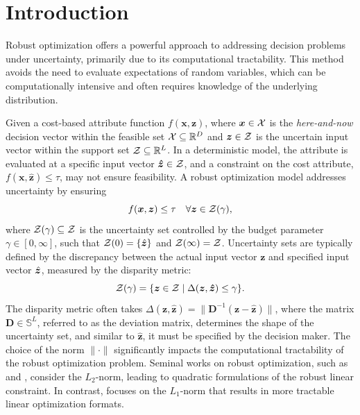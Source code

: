 \documentclass[opre, nonblindrev]{informswp}
\newcommand{\1}[1]{\mathds{1}{\left(#1\right)}}
\begin{document}

\maketitle

\section{Introduction}

Robust optimization offers a powerful approach to addressing decision problems under uncertainty, primarily due to its computational tractability. This method avoids the need to evaluate expectations of random variables, which can be computationally intensive and often requires knowledge of the underlying distribution.

Given a cost-based attribute function \( f(\bm x, \bm z) \), where \( \bm x \in \mathcal{X} \) is the \emph{here-and-now} decision vector within the feasible set \( \mathcal{X} \subseteq \mathbb{R}^D \) and \( \bm z \in \mathcal{Z} \) is the uncertain input vector within the support set \( \mathcal{Z} \subseteq \mathbb{R}^L \). In a deterministic model, the attribute is evaluated at a specific input vector \( \bm{\hat{z}} \in \mathcal{Z} \), and a constraint on the cost attribute, \( f(\bm x, \bm{\hat{z}}) \leq \tau \), may not ensure feasibility. A robust optimization model addresses uncertainty by ensuring
\[ 
f(\bm x, \bm z) \leq \tau \quad \forall \bm z \in \mathcal{Z}(\gamma), 
\]
where \( \mathcal{Z}(\gamma) \subseteq \mathcal{Z} \) is the uncertainty set controlled by the budget parameter \( \gamma \in [0, \infty] \), such that \( \mathcal{Z}(0) = \{\hat{\bm{z}}\} \) and \( \mathcal{Z}(\infty) = \mathcal{Z} \). Uncertainty sets are typically defined by the discrepancy between the actual input vector $\bm z$ and specified input vector $\hat{\bm{z}}$, measured by the disparity metric:
$$
\mathcal{Z}(\gamma) = \{ \bm z \in \mathcal{Z} \;|\; \Delta(\bm z, \bm{\hat{z}}) \leq \gamma \}.
$$
The disparity metric often takes $\Delta(\bm z, \bm{\hat{z}}) = \|\mathbf{D}^{-1}(\bm z - \bm{\hat{z}})\|$, where the matrix \( \mathbf{D} \in \mathbb{S}^L \), referred to as the deviation matrix, determines the shape of the uncertainty set, and similar to \( \bm{\hat{z}} \), it must be specified by the decision maker. The choice of the norm \( \|\cdot\| \) significantly impacts the computational tractability of the robust optimization problem. Seminal works on robust optimization, such as \cite{ben1998robust} and \cite{el1998robust}, consider the \( L_2 \)-norm, leading to quadratic formulations of the robust linear constraint. In contrast, \cite{bertsimas2004price} focuses on the \( L_1 \)-norm that results in more tractable linear optimization formats. 
\end{document}
